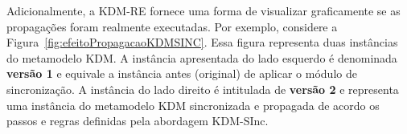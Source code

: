 Adicionalmente, a KDM-RE fornece uma forma de visualizar graficamente se as propagações foram realmente executadas. Por exemplo, considere a Figura~\ref{fig:efeitoPropagacaoKDMSINC}. Essa figura representa duas instâncias do metamodelo KDM. A instância apresentada do lado esquerdo é denominada \textbf{versão 1} e equivale a instância antes (original) de aplicar o módulo de sincronização. A instância do lado direito é intitulada de \textbf{versão 2} e representa uma instância do metamodelo KDM sincronizada e propagada de acordo os passos e regras definidas pela abordagem KDM-SInc.%









